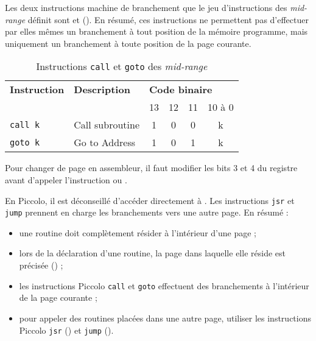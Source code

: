 Les deux instructions machine de branchement que le jeu d'instructions des \emph{mid-range} définit sont  et  (). En résumé, ces instructions ne permettent pas d'effectuer par elles mêmes un branchement à tout position de la mémoire programme, mais uniquement un branchement à toute position de la page courante.

\begin{table}[!ht]
  \centering
  \small
  \begin{tabular}{llcccc}
    \textbf{Instruction} & \textbf{Description} & \multicolumn{4}{l}{\bf Code binaire}\\
                         &                      & 13 & 12 & 11 & 10 à 0\\
    \hline
    \texttt{call k}  & Call subroutine & 1 & 0 & 0 & k \\
    \texttt{goto k}  & Go to Address   & 1 & 0 & 1 & k \\
    \hline
  \end{tabular}
  \caption{Instructions \texttt{call} et \texttt{goto} des \emph{mid-range}}
\end{table}



Pour changer de page en assembleur, il faut modifier les bits 3 et 4 du registre  avant d'appeler l'instruction  ou .

En Piccolo, il est déconseillé d'accéder directement à . Les instructions \texttt{jsr} et \texttt{jump} prennent en charge les branchements vers une autre page. En résumé :
\begin{itemize}
  \item une routine doit complètement résider à l'intérieur d'une page ;
  \item lors de la déclaration d'une routine, la page dans laquelle elle réside est précisée () ;
  \item les instructions Piccolo \texttt{call} et \texttt{goto} effectuent des branchements à l'intérieur de la page courante ;
  \item pour appeler des routines placées dans une autre page, utiliser les instructions Piccolo \texttt{jsr} () et \texttt{jump} ().
\end{itemize}



